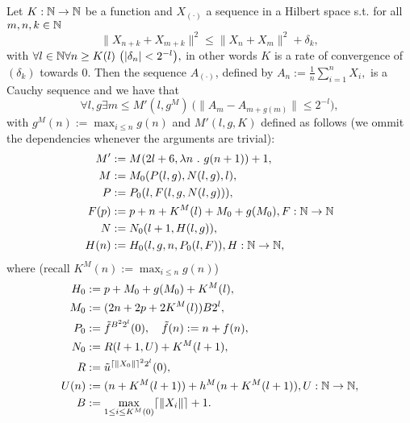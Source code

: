 \begin{thm} \label{t:fin}
Let $K:\mathbb{N}\to\mathbb{N}$ be a function and $X_{(\cdot)}$ a sequence in a Hilbert space s.t. for all $m,n,k\in\mathbb{N}$
\[
\|X_{n+k} + X_{m+k}\|^2 \leq \|X_{n} + X_{m}\|^2+\delta_k,
\]
with
$
\forall l\in\mathbb{N}\forall n\geq K(l)\ \big( |\delta_{n}|<2^{-l}\big),
$
in other words $K$ is a rate of convergence of $(\delta_k)$ towards 0.
Then the sequence $A_{(\cdot)}$, defined by
$
A_n:=\frac{1}{n}\sum^n_{i=1}X_i,
$
is a Cauchy sequence and we have that
\[
\forall l,g \exists m\leq M'(l,g^M)\ \big( \|A_{m}-A_{m+g(m)}\|\leq 2^{-l} \big),
\]
with $g^M(n):=\max_{i\leq n} g(n)$ and $M'(l,g,K)$ defined as follows (we ommit the dependencies whenever the arguments are trivial):
\begin{align*}
M'&:=M(2l+6, \lambda n\ .\ g(n+1))+1,\\
M&:=M_0( P(l,g), N(l,g), l),\\
P&:=P_0(l,F(l,g,N(l,g))),\\
F(p)&:=p+n+K^M(l)+M_0+g(M_0), F:\mathbb{N}\to\mathbb{N}\\
N&:=N_0(l+1,H(l,g)), \\
H(n)&:= H_0(l,g,n,P_0(l,F)), H:\mathbb{N}\to\mathbb{N},
\end{align*}
where (recall $K^M(n):=\max_{i\leq n} g(n)$)
\begin{align*}
 H_0&:= p + M_0+g(M_0)+K^M(l),\\
 M_0&:=(2n + 2p + 2K^M(l))B2^{l},\\
 P_0&:=\tilde f^{B^22^l}(0),\quad \tilde f(n):=n + f(n),\\
 N_0&:=R(l+1,U)+K^M(l+1), \\
 R&:=\tilde u^{\lceil \|X_0\| \rceil^22^l}(0),\\
 U(n)&:=(n + K^M(l+1))+h^M(n + K^M(l+1)), U:\mathbb{N}\to\mathbb{N},\\
 B&:=\max_{1\leq i \leq K^M(0)} \lceil \|X_i\| \rceil+1.\\
\end{align*}
\end{thm}

